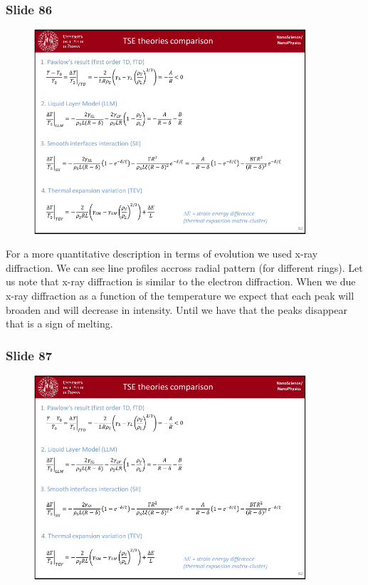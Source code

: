 \documentclass[../main/main.tex]{subfiles}
\begin{document}
\newpage

\subsubsection{Slide 86}

\begin{figure}[h!]
\centering
\includegraphics[page=5,width=0.9\textwidth]{../lessons/pdf_file/5_lesson.pdf}
\end{figure}


For a more quantitative description in terms of evolution we used x-ray diffraction. We can see line profiles accross radial pattern (for different rings). Let us note that x-ray diffraction is similar to the electron diffraction.
When we due x-ray diffraction as a function of the temperature we expect that each peak will broaden and will decrease in intensity. Until we have that the peaks disappear that is a sign of melting.

\newpage

\subsubsection{Slide 87}

\begin{figure}[h!]
\centering
\includegraphics[page=6,width=0.9\textwidth]{../lessons/pdf_file/5_lesson.pdf}
\end{figure}
\end{document}
